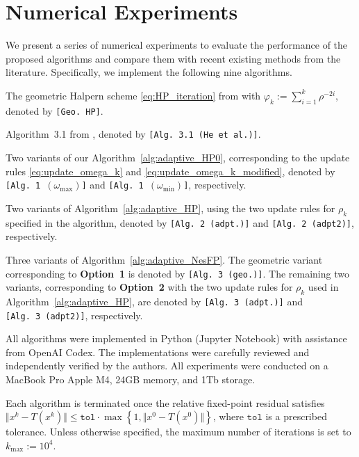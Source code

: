 \documentclass{article}
\theoremstyle{plain}
\theoremstyle{definition}
\newcommand{\norms}[1]{\Vert#1\Vert}
\newcommand{\0}{\boldsymbol{0}}
\begin{document}
\section{Numerical Experiments}\label{sec:num_examples}
We present a series of numerical experiments to evaluate the performance of the proposed algorithms and compare them with recent existing methods from the literature. 
Specifically, we implement the following nine algorithms.
\begin{compactitem}
\item The geometric Halpern scheme \eqref{eq:HP_iteration} from \cite{park2022exact} with $\varphi_k := \sum_{i=1}^k\rho^{-2i}$, denoted by \texttt{[Geo.~HP]}.

\item Algorithm~3.1 from \cite{he2024convergence}, denoted by \texttt{[Alg.~3.1~(He~et~al.)]}.

\item Two variants of our Algorithm~\ref{alg:adaptive_HP0}, corresponding to the update rules \eqref{eq:update_omega_k} and \eqref{eq:update_omega_k_modified}, denoted by \texttt{[Alg.~1~$(\omega_{\max})$]} and \texttt{[Alg.~1~$(\omega_{\min})$]}, respectively.

\item Two variants of Algorithm~\ref{alg:adaptive_HP}, using the two update rules for $\rho_k$ specified in the algorithm, denoted by \texttt{[Alg.~2~(adpt.)]} and \texttt{[Alg.~2~(adpt2)]}, respectively.

\item Three variants of Algorithm~\ref{alg:adaptive_NesFP}. The geometric variant corresponding to \textbf{Option~1} is denoted by \texttt{[Alg.~3~(geo.)]}. The remaining two variants, corresponding to \textbf{Option~2} with the two update rules for $\rho_k$ used in Algorithm~\ref{alg:adaptive_HP}, are denoted by \texttt{[Alg.~3~(adpt.)]} and \texttt{[Alg.~3~(adpt2)]}, respectively.
\end{compactitem}
All algorithms were implemented in Python (Jupyter Notebook) with assistance from OpenAI Codex.
The implementations were carefully reviewed and independently verified by the authors. All experiments were conducted on a MacBook Pro Apple M4, 24GB memory, and 1Tb storage.

Each algorithm is terminated once the relative fixed-point residual satisfies $\norms{x^k-T(x^k)} \leq \texttt{tol}\cdot\max\left\{1,\norms{x^0-T(x^0)}\right\}$, where $\texttt{tol}$ is a prescribed tolerance. Unless otherwise specified, the maximum number of iterations is set to $k_{\max} := 10^4$.
\end{document}
